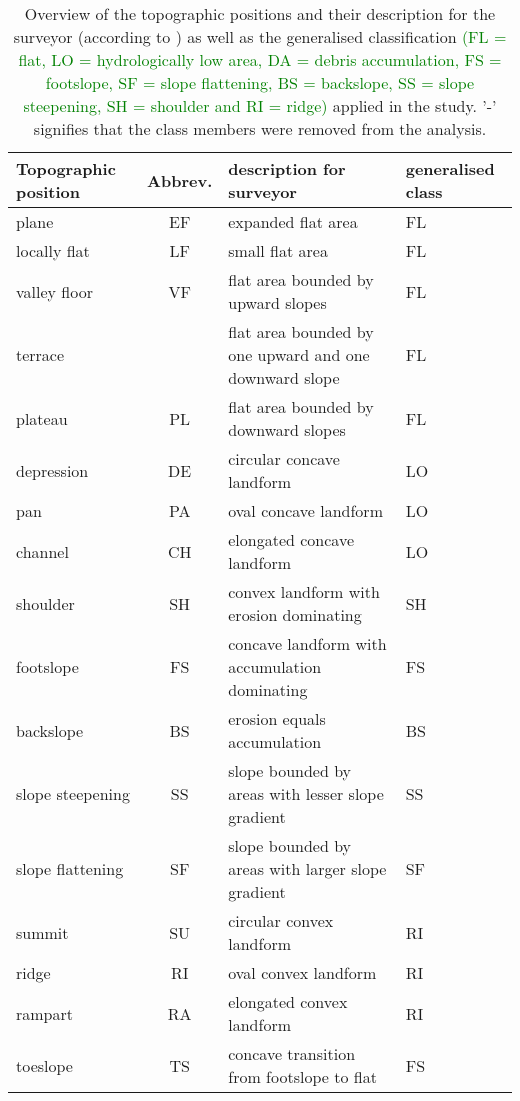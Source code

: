 \documentclass[preprint,12pt,authoryear]{elsarticle}
\begin{document}
\begin{table}[!htbp]

\caption{Overview of the topographic positions and their description for the surveyor (according to \cite{Englisch1998}) as well as the generalised classification \textcolor{green}{ (FL = flat, LO = hydrologically low area, DA = debris accumulation, FS = footslope, SF = slope flattening, BS = backslope, SS = slope steepening, SH = shoulder and RI = ridge)} applied in the study. '-' signifies that the class members were removed from the analysis. }
\begin{center}   
\small
\begin{tabular}{  p{2.0cm} c p{7cm} p{1.5cm} }
	\hline
	Topographic position & Abbrev. & description for surveyor & generalised class \\ \hline
	plane &EF& expanded flat area  & FL \\ \hline
	locally flat &LF&	small flat area  & FL \\  \hline
	valley floor &VF& flat area bounded by upward slopes  & FL \\  \hline
	\raisebox{-0ex} {terrace} &\raisebox{-0ex}{TE} & flat area bounded by one upward and one downward slope  & FL \\   \hline
	plateau &PL& flat area bounded by downward slopes  & FL \\   \hline
	depression &DE& circular concave landform & LO \\   \hline
	pan &PA& oval concave landform & LO  \\   \hline
	channel &CH& elongated concave landform  & LO\\   \hline
	shoulder &SH& convex landform with erosion dominating & SH \\   \hline
	footslope &FS& concave landform with accumulation dominating  & FS\\   \hline
	backslope &BS& erosion equals accumulation & BS  \\   \hline
	slope steepening &SS& slope bounded by areas with lesser slope gradient  & SS \\   \hline
	slope flattening &SF& slope bounded by areas with larger slope gradient & SF \\   \hline
 	summit &SU& circular convex landform & RI \\   \hline
	ridge &RI& oval convex landform  & RI\\   \hline
	rampart &RA& elongated convex landform  & RI\\   \hline
	toeslope &TS& concave transition from footslope to flat & FS \\   \hline

\end{tabular}
\end{center}
\end{table}
\end{document}
